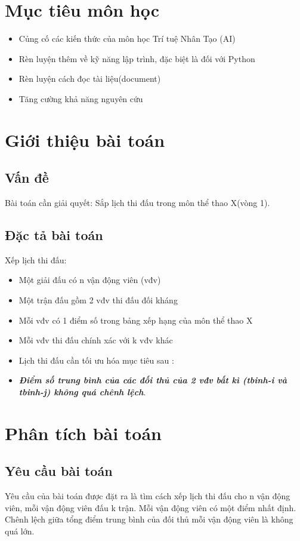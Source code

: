 \documentclass[13pt,a4paper]{article}
\begin{document}
\newpage
\tableofcontents
\newpage    
\listoffigures
\newpage
\listoftables
\newpage
\fontsize{13pt}{1.0}\selectfont
\section{Mục tiêu môn học}
\begin{itemize}
	\item Củng cố các kiến thức của môn học Trí tuệ Nhân Tạo (AI)
	\item Rèn luyện thêm về kỹ năng lập trình, đặc biệt là đối với Python
	\item Rèn luyện cách đọc tài liệu(document)
	\item Tăng cường khả năng nguyên cứu
\end{itemize}
\section{Giới thiệu bài toán}
\subsection{Vấn đề}
Bài toán cần giải quyết: Sắp lịch thi đấu trong môn thể thao X(vòng 1).
\subsection{Đặc tả bài toán}
\indent	Xếp lịch thi đấu:
	\begin{itemize}
		\item Một giải đấu có n vận động viên (vđv)
		\item Một trận đấu gồm 2 vđv thi đấu đối kháng
		\item Mỗi vđv có 1 điểm số trong bảng xếp hạng của môn thể thao X
		\item Mỗi vđv thi đấu chính xác với k vđv khác
		\item Lịch thi đấu cần tối ưu hóa mục tiêu sau :
		\item[] \textbf{\textit{Điểm số trung bình của các đối thủ của 2 vđv bất kì (tbinh-i và tbinh-j) không quá chênh lệch}}.
	\end{itemize}

\section{Phân tích bài toán}
\subsection{Yêu cầu bài toán}
Yêu cầu của bài toán được đặt ra là tìm cách xếp lịch thi đấu cho n vận động viên, mỗi vận động viên đấu k trận. Mỗi vận động viên có một điểm nhất định. Chênh lệch giữa tổng điểm trung bình của đối thủ mỗi vận động viên là không quá lớn.
\end{document}
